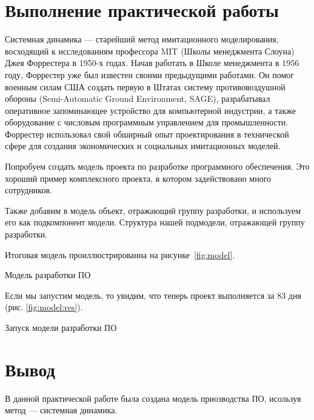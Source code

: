 \graphicspath{{./img}} %

\section*{Выполнение практической работы}
Системная динамика --- старейший метод имитационного моделирования,
восходящий к исследованиям профессора MIT (Школы менеджмента
Слоуна) Джея Форрестера в 1950-х годах. Начав работать в Школе
менеджмента в 1956 году, Форрестер уже был известен своими
предыдущими работами. Он помог военным силам США создать первую
в Штатах систему противовоздушной обороны (Semi-Automatic Ground
Environment, SAGE), разрабатывал оперативное запоминающее устройство
для компьютерной индустрии, а также оборудование с числовым
программным управлением для промышленности. Форрестер использовал
свой обширный опыт проектирования в технической сфере для создания
экономических и социальных имитационных моделей.\par
Попробуем создать модель проекта по разработке программного
обеспечения. Это хороший пример комплексного проекта, в котором
задействовано много сотрудников.\par
Также добавим в модель объект, отражающий группу разработки, и используем
его как подкомпонент модели. Структура нашей подмодели,
отражающей группу разработки.\par
Итоговая модель проиллюстрированна на рисунке~\ref{fig:model}.

\begin{image}
	\caption{Модель разработки ПО}
	\label{fig:model}
\end{image}

Если мы запустим модель, то увидим, что теперь проект
выполняется за 83 дня (рис. \ref{fig:model:res}).

\begin{image}
	\caption{Запуск модели разработки ПО}
	\label{fig:model:res}
\end{image}

\clearpage

\section*{\LARGE Вывод}
В данной практической работе была создана модель приозводства ПО,
исользуя метод --- системная динамика.

